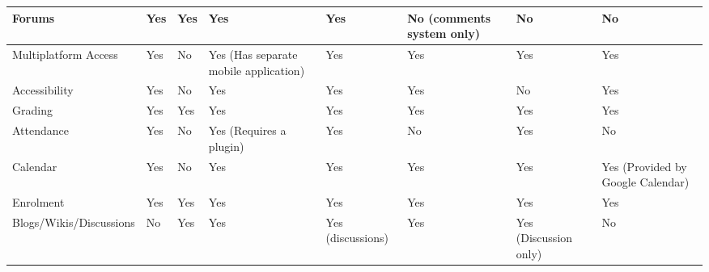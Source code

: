 \begin{table}[ht]
{\begin{tabular}{llllllll}
        \multicolumn{1}{|l|}{Forums}                      & \multicolumn{1}{l|}{Yes} & \multicolumn{1}{l|}{Yes} & \multicolumn{1}{l|}{Yes} & \multicolumn{1}{l|}{Yes} & \multicolumn{1}{l|}{No (comments system only)} & \multicolumn{1}{l|}{No} & \multicolumn{1}{l|}{No} \\ \hline
        \multicolumn{1}{|l|}{Multiplatform Access}        & \multicolumn{1}{l|}{Yes} & \multicolumn{1}{l|}{No} & \multicolumn{1}{l|}{Yes (Has separate mobile application)} & \multicolumn{1}{l|}{Yes} & \multicolumn{1}{l|}{Yes}                       & \multicolumn{1}{l|}{Yes} & \multicolumn{1}{l|}{Yes} \\ \hline
        \multicolumn{1}{|l|}{Accessibility}               & \multicolumn{1}{l|}{Yes} & \multicolumn{1}{l|}{No} & \multicolumn{1}{l|}{Yes} & \multicolumn{1}{l|}{Yes} & \multicolumn{1}{l|}{Yes}                       & \multicolumn{1}{l|}{No} & \multicolumn{1}{l|}{Yes} \\ \hline
        \multicolumn{1}{|l|}{Grading}                     & \multicolumn{1}{l|}{Yes} & \multicolumn{1}{l|}{Yes} & \multicolumn{1}{l|}{Yes} & \multicolumn{1}{l|}{Yes} & \multicolumn{1}{l|}{Yes}                       & \multicolumn{1}{l|}{Yes} & \multicolumn{1}{l|}{Yes} \\ \hline
        \multicolumn{1}{|l|}{Attendance}                  & \multicolumn{1}{l|}{Yes} & \multicolumn{1}{l|}{No} & \multicolumn{1}{l|}{Yes (Requires a plugin)} & \multicolumn{1}{l|}{Yes} & \multicolumn{1}{l|}{No}                        & \multicolumn{1}{l|}{Yes} & \multicolumn{1}{l|}{No} \\ \hline
        \multicolumn{1}{|l|}{Calendar}                    & \multicolumn{1}{l|}{Yes} & \multicolumn{1}{l|}{No} & \multicolumn{1}{l|}{Yes} & \multicolumn{1}{l|}{Yes} & \multicolumn{1}{l|}{Yes}                       & \multicolumn{1}{l|}{Yes} & \multicolumn{1}{l|}{Yes (Provided by Google Calendar)} \\ \hline
        \multicolumn{1}{|l|}{Enrolment}                   & \multicolumn{1}{l|}{Yes} & \multicolumn{1}{l|}{Yes} & \multicolumn{1}{l|}{Yes} & \multicolumn{1}{l|}{Yes} & \multicolumn{1}{l|}{Yes}                       & \multicolumn{1}{l|}{Yes} & \multicolumn{1}{l|}{Yes} \\ \hline
        \multicolumn{1}{|l|}{Blogs/Wikis/Discussions}     & \multicolumn{1}{l|}{No} & \multicolumn{1}{l|}{Yes} & \multicolumn{1}{l|}{Yes} & \multicolumn{1}{l|}{Yes (discussions)} & \multicolumn{1}{l|}{Yes}                       & \multicolumn{1}{l|}{Yes (Discussion only)} & \multicolumn{1}{l|}{No} \\ \hline

\end{tabular}}
\end{table}
